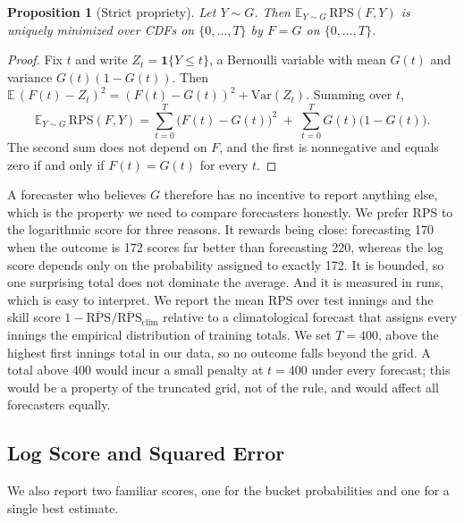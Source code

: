 \documentclass{article}
\newtheorem{proposition}{Proposition}
\newcommand{\1}{\mathbf{1}}
\newcommand{\E}{\mathbb{E}}
\newcommand{\RPS}{\mathrm{RPS}}
\begin{document}
\begin{proposition}[Strict propriety]
Let $Y \sim G$. Then $\E_{Y \sim G}\,\RPS(F, Y)$ is uniquely minimized over CDFs on $\{0, \dots, T\}$ by $F = G$ on $\{0, \dots, T\}$.
\end{proposition}
\begin{proof}
Fix $t$ and write $Z_t = \1\{Y \le t\}$, a Bernoulli variable with mean $G(t)$ and variance $G(t)(1 - G(t))$. Then $\E\,(F(t) - Z_t)^2 = (F(t) - G(t))^2 + \mathrm{Var}(Z_t)$. Summing over $t$,
\begin{equation}\label{eq:decomp}
\E_{Y \sim G}\,\RPS(F, Y) = \sum_{t=0}^{T} \big(F(t) - G(t)\big)^2 \;+\; \sum_{t=0}^{T} G(t)\big(1 - G(t)\big).
\end{equation}
The second sum does not depend on $F$, and the first is nonnegative and equals zero if and only if $F(t) = G(t)$ for every $t$.
\end{proof}

A forecaster who believes $G$ therefore has no incentive to report anything else, which is the property we need to compare forecasters honestly. We prefer RPS to the logarithmic score for three reasons. It rewards being close: forecasting 170 when the outcome is 172 scores far better than forecasting 220, whereas the log score depends only on the probability assigned to exactly 172. It is bounded, so one surprising total does not dominate the average. And it is measured in runs, which is easy to interpret. We report the mean RPS over test innings and the skill score $1 - \overline{\RPS} / \overline{\RPS}_{\text{clim}}$ relative to a climatological forecast that assigns every innings the empirical distribution of training totals. We set $T = 400$, above the highest first innings total in our data, so no outcome falls beyond the grid. A total above 400 would incur a small penalty at $t = 400$ under every forecast; this would be a property of the truncated grid, not of the rule, and would affect all forecasters equally.

\subsection{Log Score and Squared Error}\label{sec:otherscores}
We also report two familiar scores, one for the bucket probabilities and one for a single best estimate.
\end{document}
